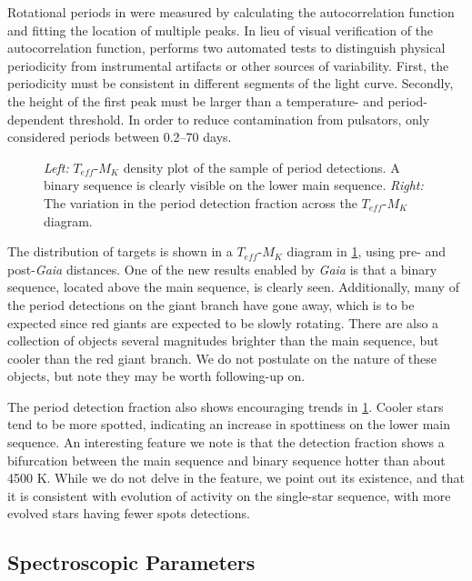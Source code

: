 \documentclass[manuscript]{aastex6}
\newcommand{\Gaia}{\mbox{\textit{Gaia}}}
\newcommand{\Teff}{\ensuremath{T_{eff}}}
\begin{document}
Rotational periods in \citet{McQuillan14} were measured by calculating the 
autocorrelation function and fitting the location of multiple peaks. In lieu 
of visual verification of the autocorrelation function, \citet{McQuillan14}
performs two automated tests to distinguish physical periodicity from
instrumental artifacts or other sources of variability. First, the 
periodicity must be consistent in different segments of the light curve.
Secondly, the height of the first peak must be larger than a temperature- and
period-dependent threshold. In order to reduce contamination from pulsators, 
\citet{McQuillan14} only considered periods between 0.2--70 days.

\begin{figure}[htb]
    \centering
    \caption{\emph{Left:} \Teff-\(M_K\) density plot of the sample of
        \citet{McQuillan14} period detections. A binary sequence is clearly 
        visible on the lower main sequence. \emph{Right:} The variation in 
        the \citet{McQuillan14} period detection fraction across the 
        \Teff-\(M_K\) diagram.}\label{fig:mcquillan_selection}
\end{figure}

The distribution of \citet{McQuillan14} targets is shown in a \Teff-\(M_K\)
diagram in \cref{fig:mcquillan_selection}, using pre- and post-\Gaia{}
distances. One of the new results enabled by \Gaia{} is that a binary sequence,
located above the main sequence, is clearly seen. Additionally, many of the
period detections on the giant branch have gone away, which is to be expected
since red giants are expected to be slowly rotating. There are also a
collection of objects several magnitudes brighter than the main sequence, but
cooler than the red giant branch. We do not postulate on the nature of these
objects, but note they may be worth following-up on.

The period detection fraction also shows encouraging trends in
\cref{fig:mcquillan_selection}. Cooler stars tend
to be more spotted, indicating an increase in spottiness on the lower main
sequence. An interesting feature we note is that the detection fraction shows a
bifurcation between the main sequence and binary sequence hotter than about
4500 K. While we do not delve in the feature, we point out its existence, and
that it is consistent with evolution of activity on the single-star sequence, 
with more evolved stars having fewer spots detections.

\subsection{Spectroscopic Parameters}
\end{document}

